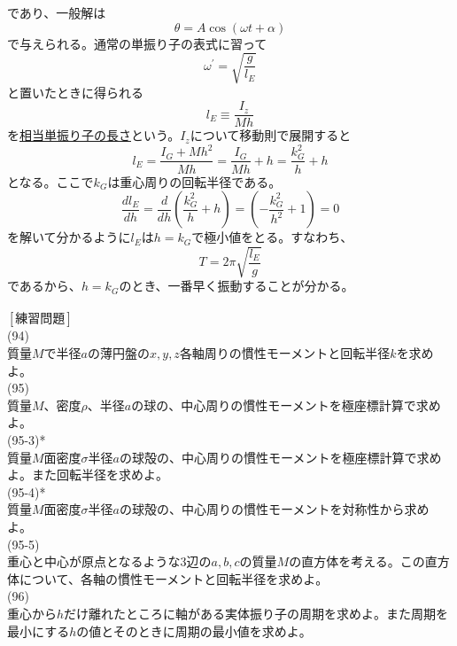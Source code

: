 \documentclass{jsarticle}
\begin{document}
であり、一般解は
\begin{equation}
\theta=A\cos(\omega t+\alpha)
\end{equation}
で与えられる。通常の単振り子の表式に習って
\begin{equation}
\omega^{\prime}=\sqrt{\frac{g}{l_{E}}}
\end{equation}
と置いたときに得られる
\begin{equation}
l_{E}\equiv\frac{I_{z}}{Mh}
\end{equation}
を\underline{相当単振り子の長さ}という。\(I_{z}\)について移動則で展開すると
\begin{equation}
l_{E}=\frac{I_{G}+Mh^{2}}{Mh}=\frac{I_{G}}{Mh}+h=\frac{k_{G}^{2}}{h}+h
\end{equation}
となる。ここで\(k_{G}\)は重心周りの回転半径である。
\[\frac{dl_{E}}{dh}=\frac{d}{dh}\left(\frac{k_{G}^{2}}{h}+h\right)=\left(-\frac{k_{G}^{2}}{h^{2}}+1\right)=0\]
を解いて分かるように\(l_{E}\)は\(h=k_{G}\)で極小値をとる。すなわち、
\[T=2\pi\sqrt{\frac{l_{E}}{g}}\]
であるから、\(h=k_{G}\)のとき、一番早く振動することが分かる。\\
\\
\newpage
\noindent
\([練習問題]\)\\
(94)\\
質量\(M\)で半径\(a\)の薄円盤の\(x,y,z\)各軸周りの慣性モーメントと回転半径\(k\)を求めよ。\\
(95)\\
質量\(M\)、密度\(\rho\)、半径\(a\)の球の、中心周りの慣性モーメントを極座標計算で求めよ。\\
(95-3)*\\
質量\(M\)面密度\(\sigma\)半径\(a\)の球殻の、中心周りの慣性モーメントを極座標計算で求めよ。また回転半径を求めよ。\\
(95-4)*\\
質量\(M\)面密度\(\sigma\)半径\(a\)の球殻の、中心周りの慣性モーメントを対称性から求めよ。\\
(95-5)\\
重心と中心が原点となるような3辺の\(a,b,c\)の質量\(M\)の直方体を考える。この直方体について、各軸の慣性モーメントと回転半径を求めよ。\\
(96)\\
重心から\(h\)だけ離れたところに軸がある実体振り子の周期を求めよ。また周期を最小にする\(h\)の値とそのときに周期の最小値を求めよ。\\
\end{document}
